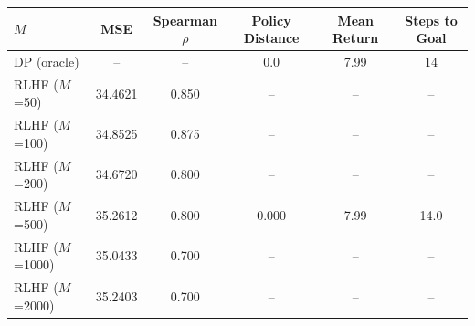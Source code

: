 \begin{tabular}{lccccc}
\toprule
$M$ & MSE & Spearman $\rho$ & Policy Distance & Mean Return & Steps to Goal \\
\midrule
DP (oracle) & -- & -- & 0.0 & 7.99 & 14 \\
\midrule
RLHF ($M$=50) & 34.4621 & 0.850 & -- & -- & -- \\
RLHF ($M$=100) & 34.8525 & 0.875 & -- & -- & -- \\
RLHF ($M$=200) & 34.6720 & 0.800 & -- & -- & -- \\
RLHF ($M$=500) & 35.2612 & 0.800 & 0.000 & 7.99 & 14.0 \\
RLHF ($M$=1000) & 35.0433 & 0.700 & -- & -- & -- \\
RLHF ($M$=2000) & 35.2403 & 0.700 & -- & -- & -- \\
\bottomrule
\end{tabular}
